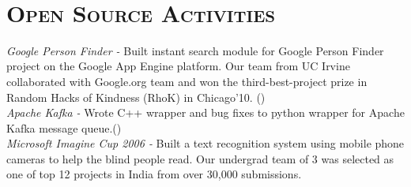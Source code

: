 \begin{resume}
\begin{formatb}
\body\\
\end{formatb}
\section{\textsc{Open Source Activities}}
\textit{Google Person Finder -} Built instant search module for Google Person Finder project  on the Google App Engine platform. Our team from UC Irvine collaborated with Google.org team and won the third-best-project prize in Random Hacks of Kindness (RhoK) in Chicago'10. ()\\
\textit{Apache Kafka -} Wrote C++ wrapper and bug fixes to python wrapper for Apache Kafka message queue.() \\
\textit{Microsoft Imagine Cup 2006 -} Built a text recognition system using mobile phone cameras to help the blind people read. Our undergrad team of 3 was selected as one of top 12 projects in India from over 30,000 submissions.\\






\end{resume}

